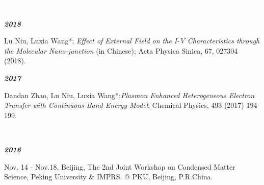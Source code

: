 \documentclass[12pt,a4paper,utf8]{report}
\begin{document}
\begin{minipage}[t]{16cm}
    \begin{snugshade}{\textcolor{white}{\textsf{\quad 
        PUBLICATIONS
    \qquad}}}\end{snugshade}
\end{minipage}\par
\vspace{0.2cm}\hspace{0.5cm}
\begin{minipage}[t]{15cm}
    {\textbf{\em{2018}}}\par
    \quad Lu Niu, Luxia Wang*; {\em{Effect of External Field on the I-V Characteristics through the Molecular Nano-junction}} (in Chinese); Acta Physica Sinica, 67, 027304 (2018).\par
    \vspace{0.2cm}
    {\textbf{\em{2017}}}\par
    \quad Dandan Zhao, Lu Niu, Luxia Wang*;{\em{Plasmon Enhanced Heterogeneous Electron Transfer with Continuous Band Energy Model}}; Chemical Physics, 493 (2017) 194-199.\par
\end{minipage}\par
\vspace{0.4cm}

\begin{minipage}[t]{16cm}
    \begin{snugshade}{\textcolor{white}{\textsf{\quad 
        REFERENCES AND ACTIVITES
    \qquad}}}\end{snugshade}
\end{minipage}\par
\vspace{0.2cm}\hspace{0.5cm}
\begin{minipage}[t]{15cm}
    {\textbf{\em{2016}}}\par
    \quad Nov. 14 - Nov.18, Beijing, The 2nd Joint Workshop on Condensed Matter Science, Peking University \& IMPRS. @ PKU, Beijing, P.R.China.\par
    \vspace{0.2cm}
\end{minipage}\par
\vspace{0.4cm}
\end{document}
